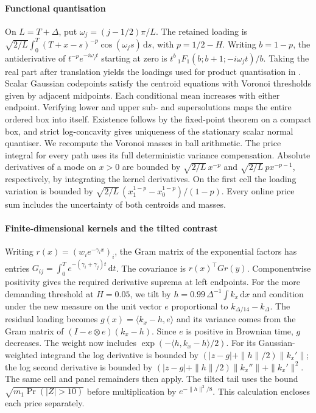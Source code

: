 \documentclass[11pt]{article}
\newcommand{\dd}{\,\mathrm{d}}
\begin{document}
\paragraph{Functional quantisation}
On $L=T+\Delta$, put $\omega_j=(j-1/2)\pi/L$. The retained loading is
$\sqrt{2/L}\int_0^T (T+x-s)^{-p}\cos(\omega_j s)\dd s$, with $p=1/2-H$.
Writing $b=1-p$, the antiderivative of $t^{-p}e^{-i\omega_jt}$ starting at zero is
$t^b\,{}_1F_1(b;b+1;-i\omega_jt)/b$. Taking the real part after translation yields
the loadings used for product quantisation in \citet{BonesiniCallegaroJacquier2023}.
Scalar Gaussian codepoints satisfy the centroid equations with Voronoi thresholds given
by adjacent midpoints. Each conditional mean increases with either endpoint.
Verifying lower and upper sub- and supersolutions maps the entire ordered box into itself.
Existence follows by the fixed-point theorem on a compact box, and strict log-concavity
gives uniqueness of the stationary scalar normal quantiser. We recompute the Voronoi
masses in ball arithmetic. The price integral for every path uses its full deterministic
variance compensation. Absolute derivatives of a mode on $x>0$ are bounded by
$\sqrt{2/L}\,x^{-p}$ and $\sqrt{2/L}\,p x^{-p-1}$, respectively, by integrating
the kernel derivatives. On the first cell the loading variation is bounded by
$\sqrt{2/L}\,(x_1^{1-p}-x_0^{1-p})/(1-p)$.
Every online price sum includes the uncertainty of both centroids and masses.

\paragraph{Finite-dimensional kernels and the tilted contrast}
Writing $r(x)=(w_i e^{-\gamma_i x})_i$, the Gram matrix of the exponential factors has entries
$G_{ij}=\int_0^T e^{-(\gamma_i+\gamma_j)t}\dd t$.
The covariance is $r(x)^\top G r(y)$. Componentwise positivity gives the required
derivative suprema at left endpoints. For the more demanding threshold at $H=0.05$,
we tilt by $h=0.99\,\Delta^{-1}\int k_x\dd x$ and condition under the new measure on
the unit vector $e$ proportional to $k_{\Delta/14}-k_\Delta$. The residual loading becomes
$g(x)=\langle k_x-h,e\rangle$ and its variance comes from the Gram matrix of
$(I-e\otimes e)(k_x-h)$. Since $e$ is positive in Brownian time, $g$ decreases.
The weight now includes $\exp(-\langle h,k_x-h\rangle/2)$. For its Gaussian-weighted
integrand the log derivative is bounded by
$(|z-g|+\|h\|/2)\|k_x'\|$; the log second derivative is bounded by
$(|z-g|+\|h\|/2)\|k_x''\|+\|k_x'\|^2$. The same cell and panel remainders then apply.
The tilted tail uses the bound $\sqrt{m_1\Pr(|Z|>10)}$ before multiplication by
$e^{-\|h\|^2/8}$. This calculation encloses each price separately.
\end{document}

